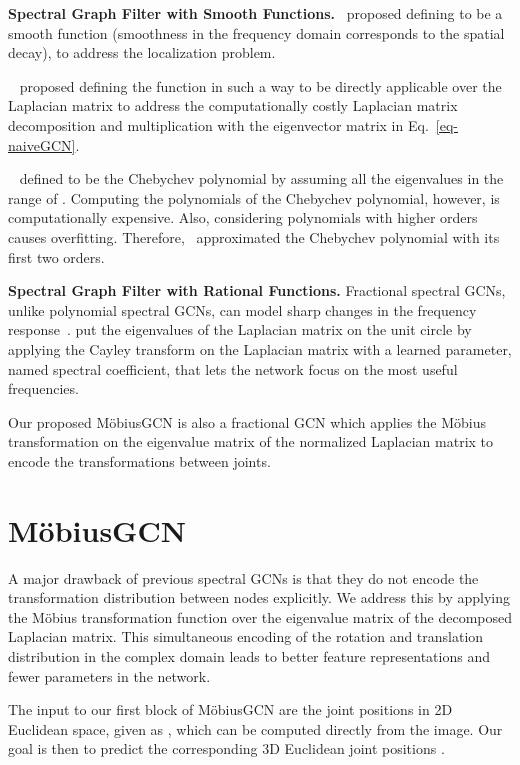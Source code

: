 \documentclass[runningheads]{llncs}
\begin{document}
\textbf{Spectral Graph Filter with Smooth Functions.}~\citet{henaff2015deep} proposed defining  to be a smooth function (smoothness in the frequency domain corresponds to the spatial decay), to address the localization problem.

 ~\citet{defferrard2016convolutional} proposed defining the function  in such a way to be directly applicable over the Laplacian matrix to address the computationally costly Laplacian matrix decomposition and multiplication with the eigenvector matrix in Eq.~\eqref{eq-naiveGCN}.

~\citet{kipf2016semi} defined  to be the Chebychev polynomial by assuming all the eigenvalues in the range of . Computing the polynomials of the Chebychev polynomial, however, is computationally expensive. Also, considering polynomials with higher orders causes overfitting. Therefore,~\citet{kipf2016semi} approximated the Chebychev polynomial with its first two orders.

\textbf{Spectral Graph Filter with Rational Functions.} Fractional spectral GCNs, unlike polynomial spectral GCNs, can model sharp changes in the frequency response~\cite{bianchi2021graph}.
\citet{levie2017cayleynets} put the eigenvalues of the Laplacian matrix on the unit circle by applying the Cayley transform on the Laplacian matrix with a learned parameter, named spectral coefficient, that lets the network focus on the most useful frequencies.

Our proposed M\"obiusGCN is also a fractional GCN which applies the M\"obius transformation on the eigenvalue matrix of the normalized Laplacian matrix to encode the transformations between joints.

\section{M\"{o}biusGCN}
A major drawback of previous spectral GCNs is that they do not encode the transformation distribution between nodes explicitly. We address this by applying the M\"obius transformation function over the eigenvalue matrix of the decomposed Laplacian matrix. This simultaneous encoding of the rotation and translation distribution in the complex domain leads to better feature representations and fewer parameters in the network.

The input to our first block of M\"obiusGCN are the joint positions in 2D Euclidean space, given as , which can be computed directly from the image. Our goal is then to predict the corresponding 3D Euclidean joint positions .
\end{document}
